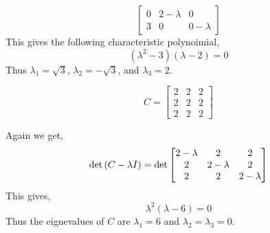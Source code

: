 \begin{enumerate}[label=\arabic*.]
\begin{mdframed}[style=MyFrame]
\begin{equation}
\begin{bmatrix}
                    0           &   2-\lambda   & 0             \\
                    3           &   0           & 0-\lambda 
                \end{bmatrix}
            \end{equation}
            This gives the following characteristic polynoimial,
            \begin{equation}
                \left(\lambda^{2}-3\right)\left(\lambda-2\right) = 0
            \end{equation}
            Thus $\lambda_{1} =  \sqrt{3}$, $\lambda_{2} = -\sqrt{3}$, and
            $\lambda_{3} =2 $.
        \end{mdframed}
            \begin{equation}
                C =
                \begin{bmatrix}
                    2 & 2 & 2 \\ 
                    2 & 2 & 2 \\
                    2 & 2 & 2
                \end{bmatrix}
            \end{equation}
            \begin{mdframed}[style=MyFrame]
                Again we get,
                \begin{equation}
                    \text{det}\left(C-\lambda I\right)
                    =
                    \text{det}
                    \begin{bmatrix}
                        2-\lambda       &       2           &   2           \\ 
                        2               &       2-\lambda   &   2           \\
                        2               &       2           &   2-\lambda
                    \end{bmatrix}
                \end{equation}
                This gives,
                \begin{equation}
                    \lambda^{2}\left(\lambda-6\right)=0
                \end{equation}
                Thus the eignevalues of $C$ are $\lambda_{1} = 6$ and
                $\lambda_{2} = \lambda_{3} = 0$.
            \end{mdframed}
    \end{enumerate}
